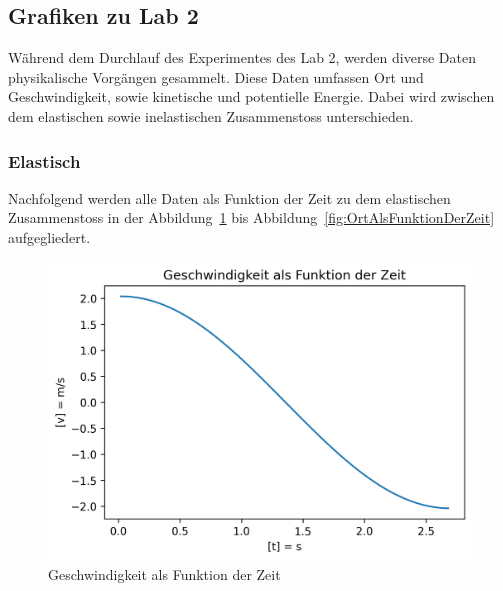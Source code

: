 \documentclass[../main.tex]{subfiles}
\begin{document}
    \subsection{Grafiken zu Lab 2}
    Während dem Durchlauf des Experimentes des Lab 2, werden diverse Daten physikalische Vorgängen
    gesammelt. Diese Daten umfassen Ort und Geschwindigkeit, sowie kinetische und potentielle Energie.
    Dabei wird zwischen dem elastischen sowie inelastischen Zusammenstoss unterschieden.
    \subsubsection{Elastisch}
    Nachfolgend werden alle Daten als Funktion der Zeit zu dem elastischen Zusammenstoss in der
    Abbildung~\ref{fig:GeschwindigkeitAlsFunktionDerZeit} bis Abbildung~\ref{fig:OrtAlsFunktionDerZeit}
    aufgegliedert.

    \begin{figure}[H]
        \begin{center}
            \centerline{\includegraphics[width=155mm]{./images/Elastisch/GeschwindigkeitAlsFunktionDerZeit}}
            \caption{Geschwindigkeit als Funktion der Zeit}
            \label{fig:GeschwindigkeitAlsFunktionDerZeit}
        \end{center}
    \end{figure}
\end{document}
